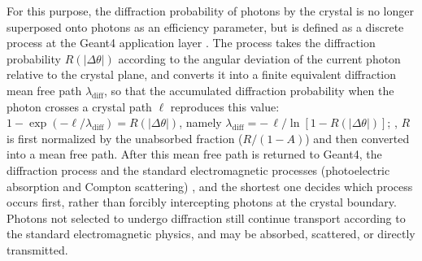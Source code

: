 \documentclass[11pt]{article}
\begin{document}
For this purpose, the diffraction probability of photons by the crystal is no longer superposed onto photons as an efficiency parameter, but is defined as a discrete process at the Geant4 application layer \cite{Agostinelli2003,Allison2016}. The process takes the diffraction probability $R(|\Delta\theta|)$ according to the angular deviation of the current photon relative to the crystal plane, and converts it into a finite equivalent diffraction mean free path $\lambda_{\mathrm{diff}}$, so that the accumulated diffraction probability when the photon crosses a crystal path $\ell$ reproduces this value: $1-\exp(-\ell/\lambda_{\mathrm{diff}})=R(|\Delta\theta|)$, namely $\lambda_{\mathrm{diff}}=-\,\ell/\ln[1-R(|\Delta\theta|)]$; , $R$ is first normalized by the unabsorbed fraction ($R/(1-A)$) and then converted into a mean free path. After this mean free path is returned to Geant4, the diffraction process and the standard electromagnetic processes (photoelectric absorption and Compton scattering) , and the shortest one decides which process occurs first, rather than forcibly intercepting photons at the crystal boundary. Photons not selected to undergo diffraction still continue transport according to the standard electromagnetic physics, and may be absorbed, scattered, or directly transmitted.
\end{document}
